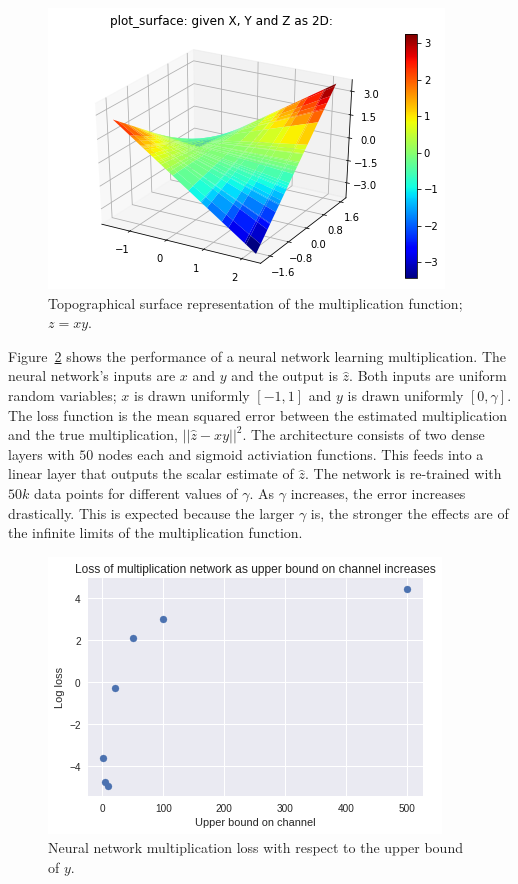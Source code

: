 \begin{figure}
\begin{center}
\includegraphics{figures/equal/Multiplication_Function_plot.png}
\caption{Topographical surface representation of the multiplication function; $z=xy$.}
\label{fig:mult_fx}
\end{center}
\end{figure}

Figure~\ref{fig:mult_bound} shows the performance of a neural network learning multiplication.
The neural network's inputs are $x$ and $y$ and the output is $\hat{z}$.  Both inputs are uniform random variables; $x$ is drawn uniformly $[-1,1]$ and $y$ is drawn uniformly $[0,\gamma]$. 
The loss function is the mean squared error between the estimated multiplication and the true multiplication, $||\hat{z}-xy||^2$.
The architecture consists of two dense layers with $50$ nodes each and sigmoid activiation functions.  This feeds into a linear layer that outputs the scalar estimate of $\hat{z}$.  
The network is re-trained with $50k$ data points for different values of $\gamma$. As $\gamma$ increases, the error increases drastically.  This is expected because the larger $\gamma$ is, the stronger the effects are of the infinite limits of the multiplication function.

\begin{figure}
\begin{center}
\includegraphics{figures/equal/Channel_upper_bound_multiplication.png}
\caption{Neural network multiplication loss with respect to the upper bound of $y$.}
\label{fig:mult_bound}
\end{center}
\end{figure}


